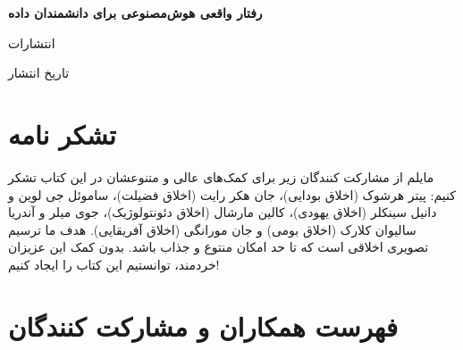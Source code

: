 \documentclass[12pt,oneside]{book}
\begin{document}
    \frontmatter

    \begin{titlepage}
        \begin{center}
            \vspace*{1cm}

            {\huge \textbf{رفتار واقعی هوش‌مصنوعی برای دانشمندان داده}}

            \vspace{0.5cm}


            \LARGE انتشارات

            \large تاریخ انتشار

        \end{center}
    \end{titlepage}

    \tableofcontents

    \newpage

    \section*{تشکر نامه}
    \begin{spacing}{1.5}
        مایلم از مشارکت کنندگان زیر برای کمک‌های عالی و متنوعشان در این کتاب تشکر کنیم: پیتر هرشوک (اخلاق بودایی)، جان هکر رایت (اخلاق فضیلت)، ساموئل جی لوین و دانیل سینکلر (اخلاق یهودی)، کالین مارشال (اخلاق دئونتولوژیک)، جوی میلر و آندریا سالیوان کلارک (اخلاق بومی) و جان مورانگی (اخلاق آفریقایی). هدف ما ترسیم تصویری اخلاقی است که تا حد امکان منتوع و جذاب باشد. بدون کمک این عزیزان خردمند، توانستیم این کتاب را ایجاد کنیم!
    \end{spacing}

    \newpage

    \section*{فهرست همکاران و مشارکت کنندگان}
\end{document}
